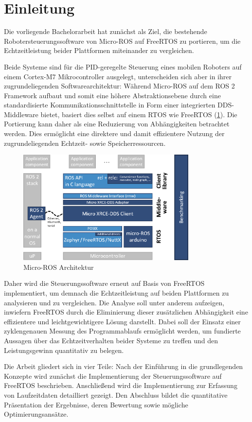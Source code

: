 \section{Einleitung}

Die vorliegende Bachelorarbeit hat zunächst als Ziel, die bestehende
Robotersteuerungssoftware von Micro-ROS auf FreeRTOS zu portieren, um die
Echtzeitleistung beider Plattformen miteinander zu vergleichen.

Beide Systeme sind für die PID-geregelte Steuerung eines mobilen Roboters auf
einem Cortex-M7 Mikrocontroller ausgelegt, unterscheiden sich aber in ihrer
zugrundeliegenden Softwarearchitektur: Während Micro-ROS auf dem \ac{ROS 2}
Framework aufbaut und somit eine höhere Abstraktionsebene durch eine
standardisierte Kommunikationsschnittstelle in Form einer integrierten
\ac{DDS}-Middleware bietet, basiert dies selbst auf einem \ac{RTOS} wie FreeRTOS
(\ref{fig:micro_ros_arch}). Die Portierung kann daher als eine Reduzierung von
Abhängigkeiten betrachtet werden. Dies ermöglicht eine direktere und damit
effizientere Nutzung der zugrundeliegenden Echtzeit- sowie Speicherressourcen.

\begin{figure}[htb] \centering
    \includegraphics[width=0.8\textwidth]{assets/Micro-ROS_architecture}
    \caption{Micro-ROS Architektur\cite[S. 6]{koubaa2023}}
    \label{fig:micro_ros_arch}
\end{figure}

Daher wird die Steuerungssoftware erneut auf Basis von FreeRTOS implementiert,
um demnach die Echtzeitleistung auf beiden Plattformen zu analysieren und zu
vergleichen. Die Analyse soll unter anderem aufzeigen, inwiefern FreeRTOS durch
die Eliminierung dieser zusätzlichen Abhängigkeit eine effizientere und
leichtgewichtigere Lösung darstellt. Dabei soll der Einsatz einer zyklengenauen
Messung des Programmablaufs ermöglicht werden, um fundierte Aussagen über das
Echtzeitverhalten beider Systeme zu treffen und den Leistungsgewinn quantitativ
zu belegen.

Die Arbeit gliedert sich in vier Teile: Nach der Einführung in die grundlegenden
Konzepte wird zunächst die Implementierung der Steuerungssoftware auf FreeRTOS
beschrieben. Anschließend wird die Implementierung zur Erfassung von
Laufzeitdaten detailliert gezeigt. Den Abschluss bildet die quantitative
Präsentation der Ergebnisse, deren Bewertung sowie mögliche Optimierungsansätze.
